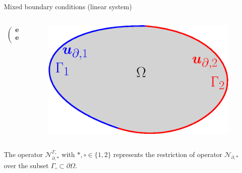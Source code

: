 \documentclass[aspectratio=169]{ISAE-Beamer}
\begin{document}
\begin{frame}{Mixed boundary conditions (linear system)}
\begin{columns}
\begin{column}{0.6\textwidth}
\begin{align*}
\begin{pmatrix}
					\bm{e}_1 \\ \bm{e}_2
				\end{pmatrix}.
			\end{align*}
		\end{column}
		\begin{column}{0.4\textwidth}
			\begin{figure}[tb]
				\centering
				\includegraphics[width=0.9\columnwidth]{pfem/bound_part.eps}
			\end{figure}
		\end{column}
	\end{columns}
	
	\vspace{1cm}
	The operator $\mathcal{N}_{\partial, *}^{\Gamma_\circ}$ with $*, \circ \in \{1, 2\}$ represents the restriction of operator $\mathcal{N}_{\partial, *}$ over the subset $\Gamma_\circ \subset \partial\Omega$.
\end{frame}
\end{document}
